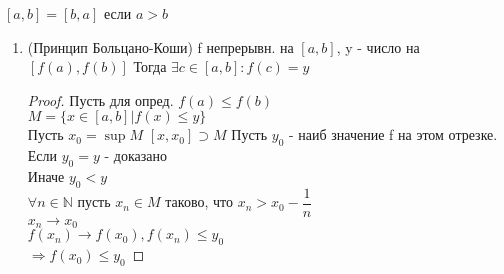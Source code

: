 \begin{consequence}
	$ [a, b] = [b,a] $ если $ a > b $
	\begin{enumerate}
		\item (Принцип Больцано-Коши) f непрерывн. на $[a, b] $, y - число на $ [f(a), f(b)] $ Тогда $ \exists c \in [a, b]  : f(c) = y$\\%
		\begin{proof}
			Пусть для опред. $ f(a) \leq f(b) $\\
			$ M = \{ x \in [a, b] | f(x) \leq y \} $\\
			Пусть $ x_0 = \sup M$ 
			$ [x, x_0] \supset M $ Пусть $y_0 $ - наиб значение f на этом отрезке. Если $ y_0 = y $ - доказано \\
			Иначе $ y_0 < y $ \\
			$ \forall n \in \mathbb{N} $ пусть $ x_n \in M $ таково, что $x_n> x_0 - \dfrac{1}{n} $  \\
			$ x_n \rightarrow x_0 $ \\
			$ f(x_n) \rightarrow f(x_0), f(x_n) \leq y_0 $\\
			$ \Rightarrow f(x_0) \leq y_0 $%
			

\end{proof}
\end{enumerate}
\end{consequence}
